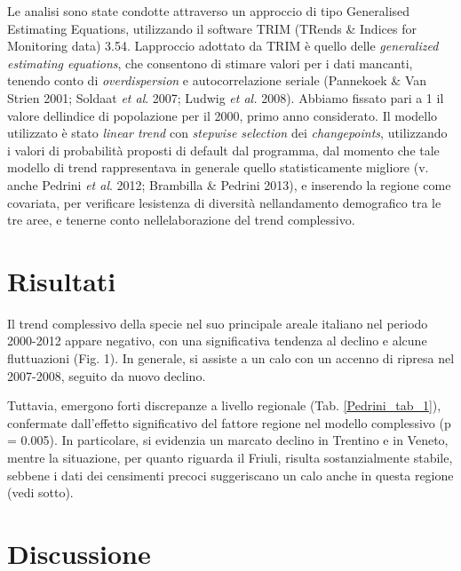 Le analisi sono state condotte attraverso un approccio di tipo
Generalised Estimating Equations, utilizzando il software TRIM (TRends
\& Indices for Monitoring data) 3.54. L{\textquotesingle}approccio
adottato da TRIM \`e quello delle
\textit{{generalized
estimating
equations}}{, che
consentono di stimare valori per i dati mancanti, tenendo conto di
}\textit{overdispersion} e autocorrelazione seriale (Pannekoek \& Van
Strien 2001; Soldaat
\textit{{et
al}}{.
}{2007; Ludwig
}\textit{{et
al.}}{
}{2008). Abbiamo
fissato pari a 1 il valore dell{\textquotesingle}indice di popolazione
per il 2000, primo anno
considerato}{.} Il
modello utilizzato \`e stato \textit{linear trend }con \textit{stepwise
selection }dei \textit{changepoints}, utilizzando i valori di
probabilit\`a proposti di default dal programma, dal momento che tale
modello di trend rappresentava in generale quello statisticamente
migliore (v. anche Pedrini \textit{et al}. 2012; Brambilla \& Pedrini
2013), e inserendo la regione come covariata, per verificare
l{\textquotesingle}esistenza di diversit\`a
nell{\textquotesingle}andamento demografico tra le tre aree, e tenerne
conto nell{\textquotesingle}elaborazione del trend complessivo.

\section*{Risultati}

Il trend complessivo della specie nel suo principale areale italiano nel
periodo 2000-2012 appare negativo, con una significativa tendenza al
declino e alcune fluttuazioni (Fig. 1). In generale, si assiste a un
calo con un accenno di ripresa nel 2007-2008, seguito da nuovo declino.


Tuttavia, emergono forti discrepanze a livello regionale (Tab. \ref{Pedrini_tab_1}),
confermate dall{\textquoteright}effetto significativo del fattore
regione nel modello complessivo (p = 0.005). In particolare, si
evidenzia un marcato declino in Trentino e in Veneto, mentre la
situazione, per quanto riguarda il Friuli, risulta sostanzialmente
stabile, sebbene i dati dei censimenti precoci suggeriscano un calo
anche in questa regione (vedi sotto). 

\section*{Discussione}

